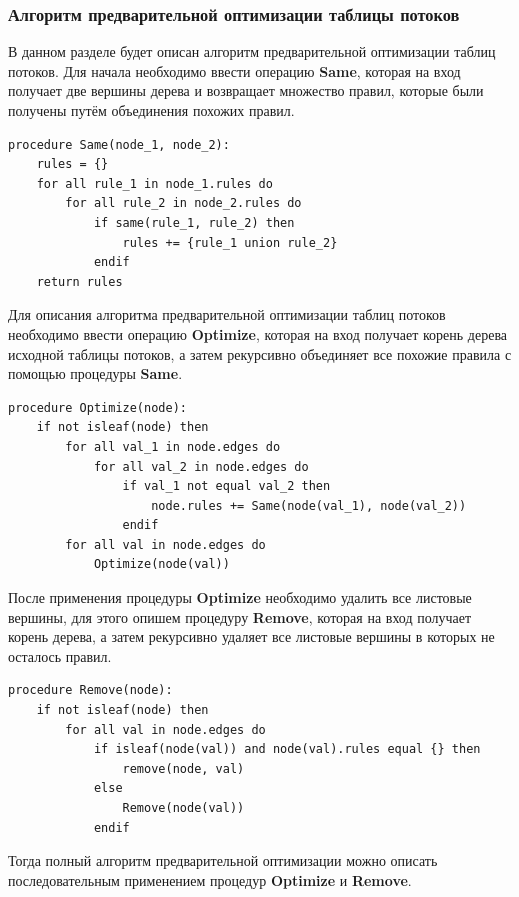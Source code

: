 \documentclass[oneside,final,12pt]{extarticle}
\begin{document}
            \subsubsection{Алгоритм предварительной оптимизации таблицы потоков}
                В данном разделе будет описан алгоритм предварительной оптимизации таблиц потоков. Для начала необходимо ввести
                операцию {\bf Same}, которая на вход получает две вершины дерева и возвращает множество правил, которые были получены путём объединения 
                похожих правил.
\begin{lstlisting}[float=htb]
procedure Same(node_1, node_2):
    rules = {}
    for all rule_1 in node_1.rules do
        for all rule_2 in node_2.rules do
            if same(rule_1, rule_2) then
                rules += {rule_1 union rule_2}
            endif
    return rules
\end{lstlisting}
                Для описания алгоритма предварительной оптимизации таблиц потоков необходимо ввести операцию {\bf Optimize}, которая на вход получает
                корень дерева исходной таблицы потоков, а затем рекурсивно объединяет все похожие правила с помощью процедуры {\bf Same}. 
\begin{lstlisting}[float=htb]
procedure Optimize(node):
    if not isleaf(node) then
        for all val_1 in node.edges do
            for all val_2 in node.edges do
                if val_1 not equal val_2 then
                    node.rules += Same(node(val_1), node(val_2))
                endif
        for all val in node.edges do
            Optimize(node(val))
\end{lstlisting}
                После применения процедуры {\bf Optimize} необходимо удалить все листовые вершины, для этого опишем процедуру {\bf Remove}, которая 
                на вход получает корень дерева, а затем рекурсивно удаляет все листовые вершины в которых не осталось правил.
\begin{lstlisting}[float=htb]
procedure Remove(node):
    if not isleaf(node) then
        for all val in node.edges do
            if isleaf(node(val)) and node(val).rules equal {} then
                remove(node, val)
            else
                Remove(node(val))
            endif
\end{lstlisting}
                Тогда полный алгоритм предварительной оптимизации можно описать последовательным применением процедур {\bf Optimize} и {\bf Remove}.
\end{document}
